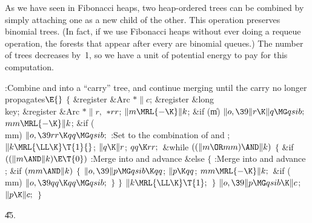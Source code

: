 As we have seen in Fibonacci heaps, two heap-ordered trees can be
combined
by simply attaching one as a new child of the other. This operation preserves
binomial trees. (In fact, if we use Fibonacci heaps without ever doing
a requeue operation, the forests that appear after every 
are binomial queues.) The number of trees decreases by~1, so we have a
unit of potential energy to pay for this computation.

\Y\B\4:Combine  and  into a ``carry'' tree, and continue
merging until the carry no longer propagates\X${}\E{}$\6
${}\{{}$\5
\1\&{register} \&{Arc} ${}{*}\|c{}$;\6
\&{register} \&{long} \\{key};\6
\&{register} \&{Arc} ${}{*}\|r,{}$ ${}{*}\\{rr}{}$;\7
${}\|m\MRL{-{\K}}\|k{}$;\5
\&{if} (\|m)\1\5
${}\|o,\39\|r\K\|q\MG\\{qsib};{}$\2\6
${}\\{mm}\MRL{-{\K}}\|k{}$;\5
\&{if} (\\{mm})\1\5
${}\|o,\39\\{rr}\K\\{qq}\MG\\{qsib};{}$\2\6
:Set  to the combination of  and \X;\6
${}\|k\MRL{{\LL}{\K}}\T{1}{}$;\5
${}\|q\K\|r{}$;\5
${}\\{qq}\K\\{rr};{}$\6
\&{while} ${}((\|m\OR\\{mm})\AND\|k){}$\5
${}\{{}$\1\6
\&{if} ${}((\|m\AND\|k)\E\T{0}){}$\1\5
:Merge  into  and advance \X\2\6
\&{else}\5
${}\{{}$\1\6
:Merge  into  and advance \X;\6
\&{if} ${}(\\{mm}\AND\|k){}$\5
${}\{{}$\1\6
${}\|o,\39\|p\MG\\{qsib}\K\\{qq}{}$;\5
${}\|p\K\\{qq}{}$;\5
${}\\{mm}\MRL{-{\K}}\|k;{}$\6
\&{if} (\\{mm})\1\5
${}\|o,\39\\{qq}\K\\{qq}\MG\\{qsib};{}$\2\6
\4${}\}{}$\2\6
\4${}\}{}$\2\6
${}\|k\MRL{{\LL}{\K}}\T{1};{}$\6
\4${}\}{}$\2\6
${}\|o,\39\|p\MG\\{qsib}\K\|c{}$;\5
${}\|p\K\|c;{}$\6
\4${}\}{}$\2\par
\U45.\fi

